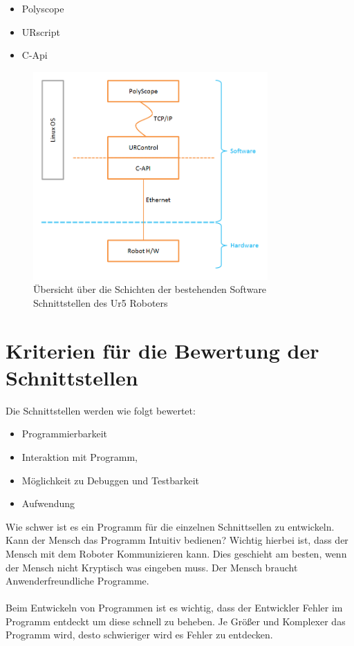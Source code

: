 \begin{itemize}
\item Polyscope
\item URscript
\item C-Api
\end{itemize}

\begin{figure}[ht]
  \centering
    \includegraphics[width=0.8\textwidth]{pic/ur_programming_levels.png}
      \caption[Schichten der Software Schnittstellen]{Übersicht über die
      Schichten der bestehenden Software Schnittstellen des Ur5 Roboters}
      \label{fig:schnittstellen_schichten}
\end{figure}

\section{Kriterien für die Bewertung der Schnittstellen}
\label{sec:criterias_of_solutions_kon}

Die Schnittstellen werden wie folgt bewertet:

\begin{itemize}
\item Programmierbarkeit
\item Interaktion mit Programm,
\item Möglichkeit zu Debuggen und Testbarkeit
\item Aufwendung
\end{itemize}

Wie schwer ist es ein Programm für die einzelnen Schnittsellen zu entwickeln.
Kann der Mensch das Programm Intuitiv bedienen? Wichtig hierbei ist, dass der Mensch mit dem Roboter Kommunizieren kann. Dies geschieht am besten, wenn der Mensch nicht Kryptisch was eingeben muss. Der Mensch braucht Anwenderfreundliche Programme.
\\\\
Beim Entwickeln von Programmen ist es wichtig, dass der Entwickler Fehler im Programm entdeckt um diese schnell zu beheben.
Je Größer und Komplexer das Programm wird, desto schwieriger wird es Fehler zu entdecken.


